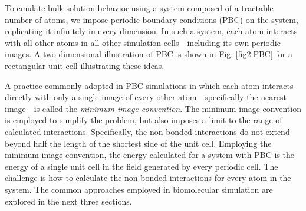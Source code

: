 To emulate bulk solution behavior using a system composed of a tractable number
of atoms, we impose periodic boundary conditions (PBC) on the system,
replicating it infinitely in every dimension. In such a system, each atom
interacts with all other atoms in all other simulation cells---including its own
periodic images. \cite{Allen_Tildesley} A two-dimensional illustration of PBC is
shown in Fig. \ref{fig2:PBC} for a rectangular unit cell illustrating these
ideas.

A practice commonly adopted in PBC simulations in which each atom interacts
directly with only a single image of every other atom---specifically the nearest
image---is called the \emph{minimum image convention}. The minimum image
convention is employed to simplify the problem, but also imposes a limit to the
range of calculated interactions. Specifically, the non-bonded interactions do
not extend beyond half the length of the shortest side of the unit cell.
Employing the minimum image convention, the energy calculated for a system with
PBC is the energy of a single unit cell in the field generated by every periodic
cell. The challenge is how to calculate the non-bonded interactions for every
atom in the system. The common approaches employed in biomolecular simulation
are explored in the next three sections.

